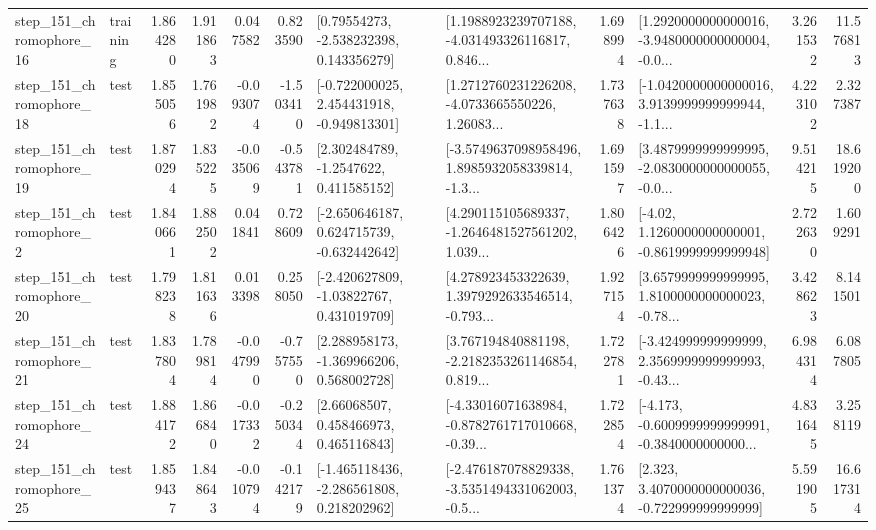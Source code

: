 \begin{tabular}{llrrrrllrlrr}
  step\_151\_chromophore\_16 &  training &      1.864280 &    1.911863 &      0.047582 &  0.823590 &     [0.79554273, -2.538232398, 0.143356279] &  [1.1988923239707188, -4.031493326116817, 0.846... &       1.698994 &  [1.2920000000000016, -3.9480000000000004, -0.0... &            3.261532 &         11.576813 \\
  step\_151\_chromophore\_18 &      test &      1.855056 &    1.761982 &     -0.093074 & -1.503410 &   [-0.722000025, 2.454431918, -0.949813301] &  [1.2712760231226208, -4.0733665550226, 1.26083... &       1.737638 &  [-1.0420000000000016, 3.9139999999999944, -1.1... &            4.223102 &          2.327387 \\
  step\_151\_chromophore\_19 &      test &      1.870294 &    1.835225 &     -0.035069 & -0.543781 &      [2.302484789, -1.2547622, 0.411585152] &  [-3.5749637098958496, 1.8985932058339814, -1.3... &       1.691597 &  [3.4879999999999995, -2.0830000000000055, -0.0... &            9.514215 &         18.619200 \\
   step\_151\_chromophore\_2 &      test &      1.840661 &    1.882502 &      0.041841 &  0.728609 &   [-2.650646187, 0.624715739, -0.632442642] &  [4.290115105689337, -1.2646481527561202, 1.039... &       1.806426 &   [-4.02, 1.1260000000000001, -0.8619999999999948] &            2.722630 &          1.609291 \\
  step\_151\_chromophore\_20 &      test &      1.798238 &    1.811636 &      0.013398 &  0.258050 &    [-2.420627809, -1.03822767, 0.431019709] &  [4.278923453322639, 1.3979292633546514, -0.793... &       1.927154 &  [3.6579999999999995, 1.8100000000000023, -0.78... &            3.428623 &          8.141501 \\
  step\_151\_chromophore\_21 &      test &      1.837804 &    1.789814 &     -0.047990 & -0.757550 &    [2.288958173, -1.369966206, 0.568002728] &  [3.767194840881198, -2.2182353261146854, 0.819... &       1.722781 &  [-3.424999999999999, 2.3569999999999993, -0.43... &            6.984314 &          6.087805 \\
  step\_151\_chromophore\_24 &      test &      1.884172 &    1.866840 &     -0.017332 & -0.250344 &      [2.66068507, 0.458466973, 0.465116843] &  [-4.33016071638984, -0.8782761717010668, -0.39... &       1.722854 &  [-4.173, -0.6009999999999991, -0.3840000000000... &            4.831645 &          3.258119 \\
  step\_151\_chromophore\_25 &      test &      1.859437 &    1.848643 &     -0.010794 & -0.142179 &   [-1.465118436, -2.286561808, 0.218202962] &  [-2.476187078829338, -3.5351494331062003, -0.5... &       1.761374 &    [2.323, 3.4070000000000036, -0.722999999999999] &            5.591905 &         16.617314 \\

\end{tabular}
